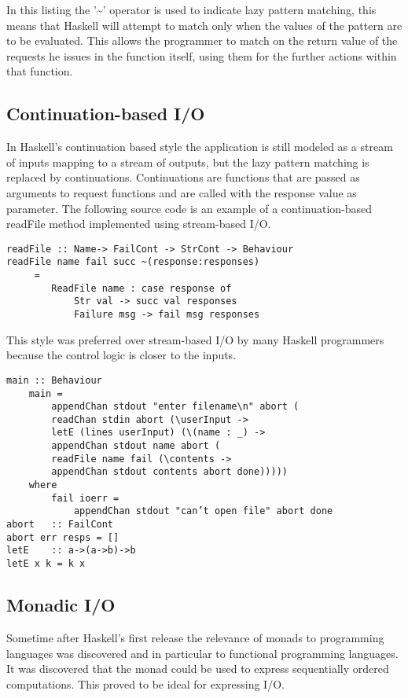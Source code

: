 In this listing the '\textasciitilde' operator is used to indicate lazy pattern matching, this means that Haskell will attempt to match only when the values of the pattern are to be evaluated. This allows the programmer to match on the return value of the requests he issues in the function itself, using them for the further actions within that function.

\subsection{Continuation-based I/O}
In Haskell's continuation based style the application is still modeled as a stream of inputs mapping to a stream of outputs, but the lazy pattern matching is replaced by continuations. Continuations are functions that are passed as arguments to request functions and are called with the response value as parameter. The following source code is an example of a continuation-based readFile method implemented using stream-based I/O.

\begin{lstlisting}[caption={Definition of readFile in continuation-based I/O in Haskell}]
readFile :: Name-> FailCont -> StrCont -> Behaviour
readFile name fail succ ~(response:responses)
	 =
		ReadFile name : case response of
			Str val -> succ val responses
			Failure msg -> fail msg responses
\end{lstlisting}

This style was preferred over stream-based I/O by many Haskell programmers because the control logic is closer to the inputs.

\begin{lstlisting}[caption={Example of continuation-based I/O in Haskell}]
main :: Behaviour
	main =
 		appendChan stdout "enter filename\n" abort (
		readChan stdin abort (\userInput ->
		letE (lines userInput) (\(name : _) ->
		appendChan stdout name abort (
		readFile name fail (\contents ->
		appendChan stdout contents abort done)))))
	where
		fail ioerr =
			appendChan stdout "can’t open file" abort done
abort	:: FailCont
abort err resps = []
letE	:: a->(a->b)->b
letE x k = k x
\end{lstlisting}

\subsection{Monadic I/O}
Sometime after Haskell's first release the relevance of monads to programming languages was discovered and in particular to functional programming languages. It was discovered that the monad could be used to express sequentially ordered computations. This proved to be ideal for expressing I/O.

